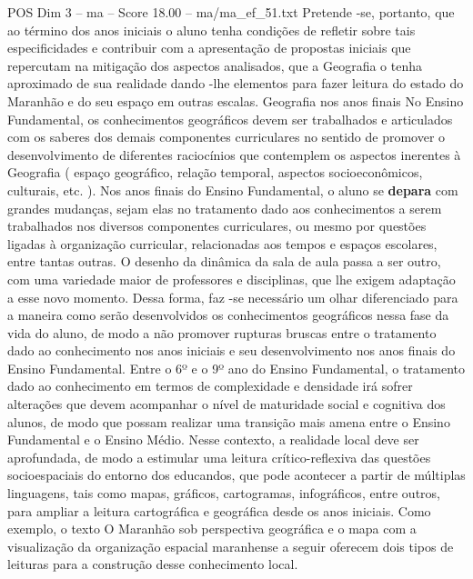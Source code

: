 \begin{textsample}{POS Dim 3 – ma – Score 18.00 – ma/ma\_ef\_51.txt}
Pretende -se, portanto, que ao término dos anos iniciais o aluno tenha condições de refletir sobre tais especificidades e contribuir com a apresentação de propostas iniciais que repercutam na mitigação dos aspectos analisados, que a Geografia o tenha aproximado de sua realidade dando -lhe elementos para fazer leitura do estado do Maranhão e do seu espaço em outras escalas.
Geografia nos anos finais No Ensino Fundamental, os conhecimentos geográficos devem ser trabalhados e articulados com os saberes dos demais componentes curriculares no sentido de promover o desenvolvimento de diferentes raciocínios que contemplem os aspectos inerentes à Geografia ( espaço geográfico, relação temporal, aspectos socioeconômicos, culturais, etc. ).
Nos anos finais do Ensino Fundamental, o aluno se \textbf{depara} com grandes mudanças, sejam elas no tratamento dado aos conhecimentos a serem trabalhados nos diversos componentes curriculares, ou mesmo por questões ligadas à organização curricular, relacionadas aos tempos e espaços escolares, entre tantas outras.
O desenho da dinâmica da sala de aula passa a ser outro, com uma variedade maior de professores e disciplinas, que lhe exigem adaptação a esse novo momento.
Dessa forma, faz -se necessário um olhar diferenciado para a maneira como serão desenvolvidos os conhecimentos geográficos nessa fase da vida do aluno, de modo a não promover rupturas bruscas entre o tratamento dado ao conhecimento nos anos iniciais e seu desenvolvimento nos anos finais do Ensino Fundamental.
Entre o 6º e o 9º ano do Ensino Fundamental, o tratamento dado ao conhecimento em termos de complexidade e densidade irá sofrer alterações que devem acompanhar o nível de maturidade social e cognitiva dos alunos, de modo que possam realizar uma transição mais amena entre o Ensino Fundamental e o Ensino Médio.
Nesse contexto, a realidade local deve ser aprofundada, de modo a estimular uma leitura crítico-reflexiva das questões socioespaciais do entorno dos educandos, que pode acontecer a partir de múltiplas linguagens, tais como mapas, gráficos, cartogramas, infográficos, entre outros, para ampliar a leitura cartográfica e geográfica desde os anos iniciais.
Como exemplo, o texto O Maranhão sob perspectiva geográfica e o mapa com a visualização da organização espacial maranhense a seguir oferecem dois tipos de leituras para a construção desse conhecimento local.

\end{textsample}
